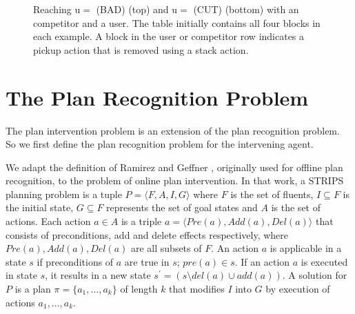 \documentclass[letterpaper]{article}
\theoremstyle{plain}
\begin{document}
\begin{figure}[t]
        \caption{Reaching $\mathrm{u}= $ (BAD) (top) and $\mathrm{u}= $ (CUT) (bottom) with an competitor and a user.  The table initially contains all four blocks in each example. A block in the user or competitor row indicates a pickup action that is removed using a stack action.}
        \label{fig:multi}
\end{figure}



\section{The Plan Recognition Problem}
\label{sec:prp}
The plan intervention problem is an extension of the plan recognition problem. So we first define the plan recognition problem for the intervening agent.

We adapt the definition of Ramirez and Geffner , originally used for offline plan recognition, to the problem of online plan intervention.
In that work, a STRIPS \cite{fikes1971strips} planning problem is a tuple $ P = \langle F, A, I, G \rangle$ where $F$ is the set of fluents, $I\subseteq F$ is the initial state, $G  \subseteq F$ represents the set of goal states and $A$ is the set of actions. 
Each action $a \in A$ is a triple $a=\langle Pre(a), Add(a), Del(a)\rangle$ that consists of preconditions, add and delete effects respectively, where $Pre(a), Add(a), Del(a)$ are all subsets of $F$. 
An action $a$ is applicable in a state $s$ if preconditions of $a$ are true in $s$; $pre(a) \in s$. 
If an action $a$ is executed in state $s$, it results in a new state $s^{\prime} = (s \setminus del(a) \cup add(a))$.  
A solution for $P$ is a plan $\pi = \{a_1, \dots ,a_k\}$ of length $k$ that modifies $I$ into $G$ by execution of actions $a_1, \dots ,a_k$.
\end{document}
